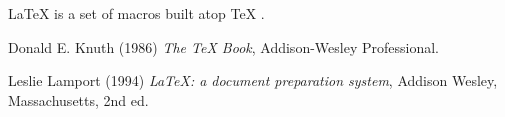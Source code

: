 \documentclass[12pt, letterpaper]{article}
\begin{document}
    


\LaTeX{} \cite{lamport94} is a set of macros built atop \TeX{} \cite{texbook}.


\begin{thebibliography}{9}
    Donald E. Knuth (1986) \emph{The \TeX{} Book}, Addison-Wesley Professional.
    
    Leslie Lamport (1994) \emph{\LaTeX: a document preparation system}, Addison
    Wesley, Massachusetts, 2nd ed.

\end{thebibliography}
\end{document}
